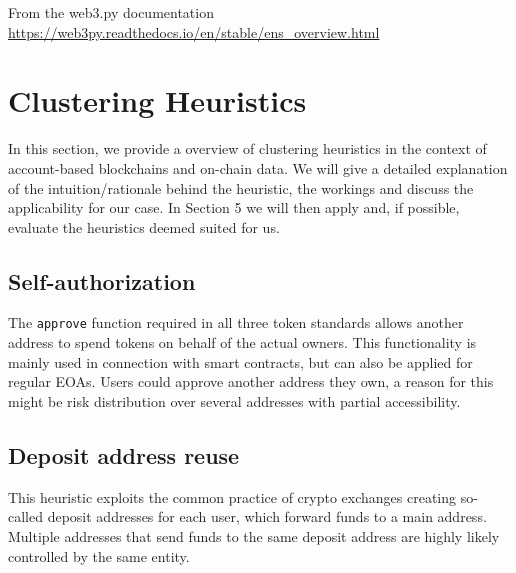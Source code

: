 \documentclass[12pt,a4paper,titlepage,oneside,english]{article}
\begin{document}

From the web3.py documentation \url{https://web3py.readthedocs.io/en/stable/ens_overview.html}




\section{Clustering Heuristics}
In this section, we provide a overview of clustering heuristics in the context of account-based blockchains and on-chain data. We will give a detailed explanation of the intuition/rationale behind the heuristic, the workings and discuss the applicability for our case. In Section 5 we will then apply and, if possible, evaluate the heuristics deemed suited for us.


\subsection{Self-authorization}
The \texttt{approve} function required in all three token standards allows another address to spend tokens on behalf of the actual owners. This functionality is mainly used in connection with smart contracts, but can also be applied for regular EOAs. Users could approve another address they own, a reason for this might be risk distribution over several addresses with partial accessibility. \citep{FV:17}

\subsection{Deposit address reuse}
This heuristic exploits the common practice of crypto exchanges creating so-called deposit addresses for each user, which forward funds to a main address. Multiple addresses that send funds to the same deposit address are highly likely controlled by the same entity. \citep{FV:17}
\end{document}
